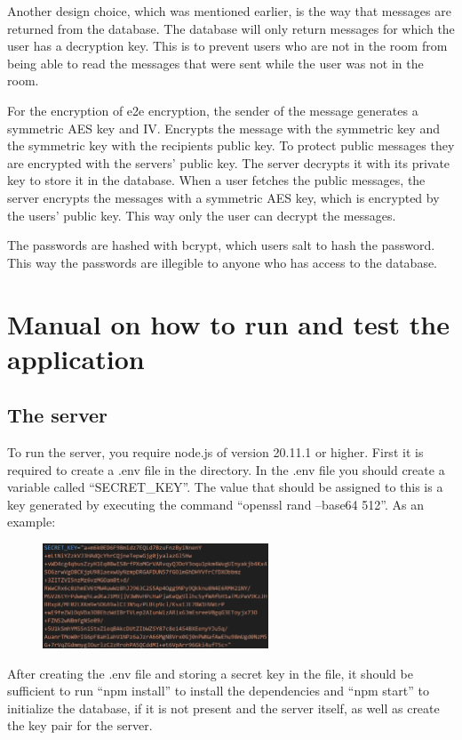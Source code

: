 \documentclass[a4paper]{article}
\begin{document}
Another design choice, which was mentioned earlier, is the way that messages are returned from the database. The database will only return messages for which the user has a decryption key. This is to prevent users who are not in the room from being able to read the messages that were sent while the user was not in the room.

For the encryption of e2e encryption, the sender of the message generates a symmetric AES key and IV. Encrypts the message with the symmetric key and the symmetric key with the recipients public key. To protect public messages they are encrypted with the servers' public key. The server decrypts it with its private key to store it in the database. When a user fetches the public messages, the server encrypts the messages with a symmetric AES key, which is encrypted by the users' public key. This way only the user can decrypt the messages.

The passwords are hashed with bcrypt, which users salt to hash the password. This way the passwords are illegible to anyone who has access to the database.
\section{Manual on how to run and test the application}
\subsection{The server}
To run the server, you require node.js of version 20.11.1 or higher. First it is required to create a .env file in the directory. In the .env file you should create a variable called \enquote{SECRET\_KEY}. The value that should be assigned to this is a key generated by executing the command \enquote{openssl rand --base64 512}. As an example:
\begin{figure}[H]
    \centering
    \includegraphics[width=0.6\textwidth]{openssl.png}
\end{figure}
After creating the .env file and storing a secret key in the file, it should be sufficient to run \enquote{npm install} to install the dependencies and \enquote{npm start} to initialize the database, if it is not present and the server itself, as well as create the key pair for the server. 
\end{document}
